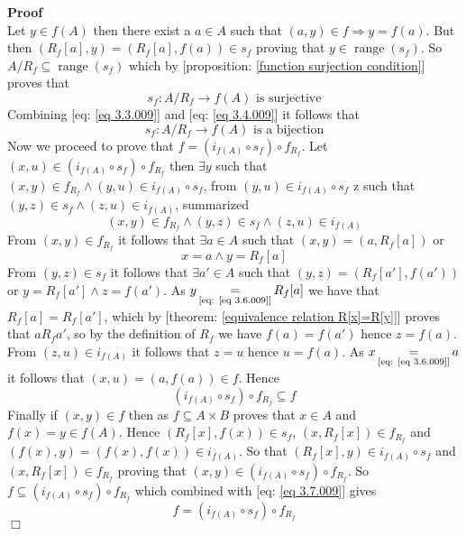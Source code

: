 \documentclass{book}
\newcommand{\equallim}{\mathop{=}\limits}
\newcommand{\tmop}[1]{\ensuremath{\operatorname{#1}}}
\newenvironment{proof}{\noindent\textbf{Proof\ }}{\hspace*{\fill}$\Box$\medskip}
\begin{document}
\begin{proof}
\begin{equation}
  \end{equation}
  Let $y \in f (A)$ then there exist a $a \in A$ such that $(a, y) \in f
  \Rightarrow y = f (a)$. But then $(R_f [a], y) = (R_f [a], f (a)) \in s_f$
  proving that $y \in \tmop{range} (s_f)$. So $A / R_f \subseteq \tmop{range}
  (s_f)$ which by [proposition: \ref{function surjection condition}] proves
  that
  \begin{equation}
    \label{eq 3.4.009} s_f : A / R_f \rightarrow f (A) \text{ is surjective}
  \end{equation}
  Combining [eq: \ref{eq 3.3.009}] and [eq: \ref{eq 3.4.009}] it follows that
  \[ s_f : A / R_f \rightarrow f (A) \text{ is a bijection} \]
  Now we proceed to prove that $f = (i_{f (A)} \circ s_f) \circ f_{R_f}$. Let
  $(x, u) \in (i_{f (A)} \circ s_f) \circ f_{R_f}$ then $\exists y$ such that
  $(x, y) \in f_{R_f} \wedge (y, u) \in i_{f (A)} \circ s_f$, from $(y, u) \in
  i_{f (A)} \circ s_f$ {\exists}z such that $(y, z) \in s_f \wedge (z, u) \in
  i_{f (A)}$, summarized
  \begin{equation}
    \label{eq 3.5.009} (x, y) \in f_{R_f} \wedge (y, z) \in s_f \wedge (z, u)
    \in i_{f (A)}
  \end{equation}
  From $(x, y) \in f_{R_f}$ it follows that $\exists a \in A$ such that $(x,
  y) = (a, R_f [a])$ or
  \begin{equation}
    \label{eq 3.6.009} x = a \wedge y = R_f [a]
  \end{equation}
  From $(y, z) \in s_f$ it follows that $\exists a' \in A$ such that $(y, z) =
  (R_f [a'], f (a'))$ or $y = R_f [a'] \wedge z = f (a')$. As $y
  \equallim_{\text{[eq: \ref{eq 3.6.009}]}} R_f [a]$ we have that $R_f [a] =
  R_f [a']$, which by [theorem: \ref{equivalence relation R[x]=R[y]}] proves
  that $a R_f a'$, so by the definition of $R_f$ we have $f (a) = f (a')$
  hence $z = f (a)$. From $(z, u) \in i_{f (A)}$ it follows that $z = u$ hence
  $u = f (a)$. As $x \equallim_{\text{[eq: \ref{eq 3.6.009}]}} a$ it follows
  that $(x, u) = (a, f (a)) \in f$. Hence
  \begin{equation}
    \label{eq 3.7.009} (i_{f (A)} \circ s_f) \circ f_{R_f} \subseteq f
  \end{equation}
  Finally if $(x, y) \in f$ then as $f \subseteq A \times B$ proves that $x
  \in A$ and $f (x) = y \in f (A)$. Hence $(R_f [x], f (x)) \in s_f$, $(x, R_f
  [x]) \in f_{R_f}$ and $(f (x), y) = (f (x), f (x)) \in i_{f (A)}$. So that
  $(R_f [x], y) \in i_{f (A)} \circ s_f$ and $(x, R_f [x]) \in f_{R_f}$
  proving that $(x, y) \in (i_{f (A)} \circ s_f) \circ f_{R_f}$. So $f
  \subseteq (i_{f (A)} \circ s_f) \circ f_{R_f}$ which combined with [eq:
  \ref{eq 3.7.009}] gives
  \[ f = (i_{f (A)} \circ s_f) \circ f_{R_f} \]
\end{proof}
\end{document}
